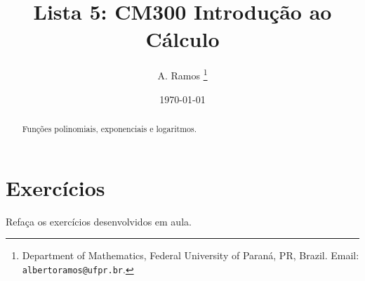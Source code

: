 \documentclass[11pt]{article}
\begin{document}
\title{Lista 5: CM300 Introdução ao Cálculo }
 
\author{
A. Ramos \thanks{Department of Mathematics,
    Federal University of Paraná, PR, Brazil.
    Email: {\tt albertoramos@ufpr.br}.}
}

\date{\today}
 
\maketitle

\begin{abstract}
   Funções polinomiais, exponenciais e logaritmos.   
\end{abstract}
 
  \section{Exercícios}   
 
 Refaça os exercícios desenvolvidos em aula.
 
\end{document}
